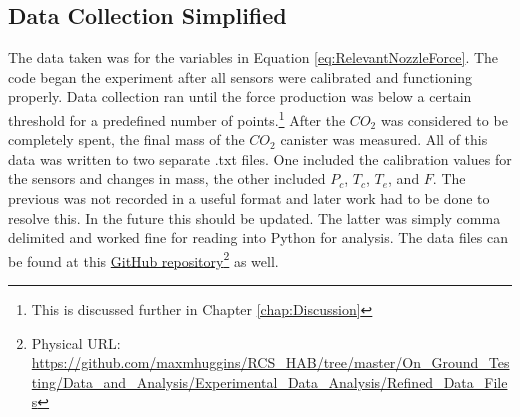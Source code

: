\subsection{Data Collection Simplified}
The data taken was for the variables in Equation \ref{eq:RelevantNozzleForce}. The code began the experiment after all sensors were calibrated and functioning properly. Data collection ran until the force production was below a certain threshold for a predefined number of points.\footnote{This is discussed further in Chapter \ref{chap:Discussion}} After the $CO_2$ was considered to be completely spent, the final mass of the $CO_2$ canister was measured. All of this data was written to two separate .txt files. One included the calibration values for the sensors and changes in mass, the other included $P_c$, $T_c$, $T_e$, and $F$. The previous was not recorded in a useful format and later work had to be done to resolve this. In the future this should be updated. The latter was simply comma delimited and worked fine for reading into Python for analysis. The data files can be found at this \href{https://github.com/maxmhuggins/RCS_HAB/tree/master/On_Ground_Testing/Data_and_Analysis/Experimental_Data_Analysis/Refined_Data_Files}{GitHub repository}\footnote{Physical URL: \url{https://github.com/maxmhuggins/RCS_HAB/tree/master/On_Ground_Testing/Data_and_Analysis/Experimental_Data_Analysis/Refined_Data_Files}} as well.